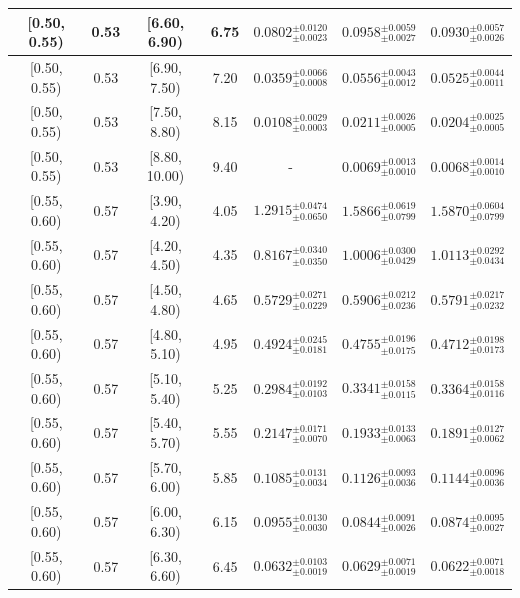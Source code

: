 \begin{longtable}{|c|c|c|c|c|c|c|}
\hline
[0.50, 0.55) & 0.53 & [6.60, 6.90) & 6.75 & $0.0802^{ \pm 0.0120 }_{ \pm 0.0023 }$ & $0.0958^{ \pm 0.0059 }_{ \pm 0.0027 }$ & $0.0930^{ \pm 0.0057 }_{ \pm 0.0026 }$ \\ 
\hline
[0.50, 0.55) & 0.53 & [6.90, 7.50) & 7.20 & $0.0359^{ \pm 0.0066 }_{ \pm 0.0008 }$ & $0.0556^{ \pm 0.0043 }_{ \pm 0.0012 }$ & $0.0525^{ \pm 0.0044 }_{ \pm 0.0011 }$ \\ 
\hline
[0.50, 0.55) & 0.53 & [7.50, 8.80) & 8.15 & $0.0108^{ \pm 0.0029 }_{ \pm 0.0003 }$ & $0.0211^{ \pm 0.0026 }_{ \pm 0.0005 }$ & $0.0204^{ \pm 0.0025 }_{ \pm 0.0005 }$ \\ 
\hline
[0.50, 0.55) & 0.53 & [8.80, 10.00) & 9.40 & - & $0.0069^{ \pm 0.0013 }_{ \pm 0.0010 }$ & $0.0068^{ \pm 0.0014 }_{ \pm 0.0010 }$ \\ 
\hline
[0.55, 0.60) & 0.57 & [3.90, 4.20) & 4.05 & $1.2915^{ \pm 0.0474 }_{ \pm 0.0650 }$ & $1.5866^{ \pm 0.0619 }_{ \pm 0.0799 }$ & $1.5870^{ \pm 0.0604 }_{ \pm 0.0799 }$ \\ 
\hline
[0.55, 0.60) & 0.57 & [4.20, 4.50) & 4.35 & $0.8167^{ \pm 0.0340 }_{ \pm 0.0350 }$ & $1.0006^{ \pm 0.0300 }_{ \pm 0.0429 }$ & $1.0113^{ \pm 0.0292 }_{ \pm 0.0434 }$ \\ 
\hline
[0.55, 0.60) & 0.57 & [4.50, 4.80) & 4.65 & $0.5729^{ \pm 0.0271 }_{ \pm 0.0229 }$ & $0.5906^{ \pm 0.0212 }_{ \pm 0.0236 }$ & $0.5791^{ \pm 0.0217 }_{ \pm 0.0232 }$ \\ 
\hline
[0.55, 0.60) & 0.57 & [4.80, 5.10) & 4.95 & $0.4924^{ \pm 0.0245 }_{ \pm 0.0181 }$ & $0.4755^{ \pm 0.0196 }_{ \pm 0.0175 }$ & $0.4712^{ \pm 0.0198 }_{ \pm 0.0173 }$ \\ 
\hline
[0.55, 0.60) & 0.57 & [5.10, 5.40) & 5.25 & $0.2984^{ \pm 0.0192 }_{ \pm 0.0103 }$ & $0.3341^{ \pm 0.0158 }_{ \pm 0.0115 }$ & $0.3364^{ \pm 0.0158 }_{ \pm 0.0116 }$ \\ 
\hline
[0.55, 0.60) & 0.57 & [5.40, 5.70) & 5.55 & $0.2147^{ \pm 0.0171 }_{ \pm 0.0070 }$ & $0.1933^{ \pm 0.0133 }_{ \pm 0.0063 }$ & $0.1891^{ \pm 0.0127 }_{ \pm 0.0062 }$ \\ 
\hline
[0.55, 0.60) & 0.57 & [5.70, 6.00) & 5.85 & $0.1085^{ \pm 0.0131 }_{ \pm 0.0034 }$ & $0.1126^{ \pm 0.0093 }_{ \pm 0.0036 }$ & $0.1144^{ \pm 0.0096 }_{ \pm 0.0036 }$ \\ 
\hline
[0.55, 0.60) & 0.57 & [6.00, 6.30) & 6.15 & $0.0955^{ \pm 0.0130 }_{ \pm 0.0030 }$ & $0.0844^{ \pm 0.0091 }_{ \pm 0.0026 }$ & $0.0874^{ \pm 0.0095 }_{ \pm 0.0027 }$ \\ 
\hline
[0.55, 0.60) & 0.57 & [6.30, 6.60) & 6.45 & $0.0632^{ \pm 0.0103 }_{ \pm 0.0019 }$ & $0.0629^{ \pm 0.0071 }_{ \pm 0.0019 }$ & $0.0622^{ \pm 0.0071 }_{ \pm 0.0018 }$ \\ 

\end{longtable}
